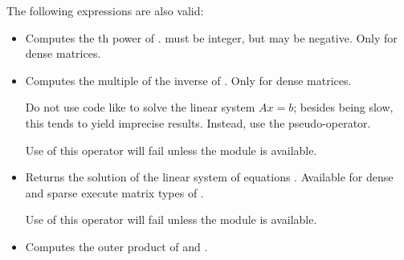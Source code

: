 The following expressions are also valid:
\begin{itemize} 
\item {}

  Computes the th power of .  must be
  integer, but may be negative. Only for dense matrices.

\item {}

  Computes the  multiple of the inverse of
  . Only for dense matrices.

  Do not use code like  to solve the linear system
  $Ax=b$; besides being slow, this tends to yield imprecise
  results. Instead, use the  pseudo-operator.

  Use of this operator will fail unless the module
   is available.

\item {}

  Returns the solution of the linear system of equations .
  Available for dense and sparse execute matrix types of .

  Use of this operator will fail unless the module
   is available.

\item {}
  
  Computes the outer product of  and .
\end{itemize}
